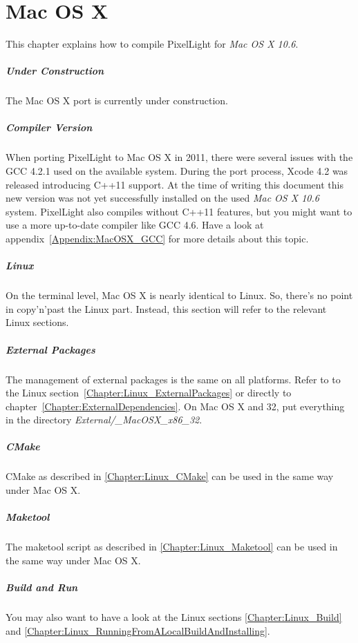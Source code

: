 \chapter{Mac OS X}
This chapter explains how to compile PixelLight for \emph{Mac OS X 10.6}.


\paragraph{Under Construction}
The Mac OS X port is currently under construction.


\paragraph{Compiler Version}
When porting PixelLight to Mac OS X in 2011, there were several issues with the \ac{GCC} 4.2.1 used on the available system. During the port process, Xcode 4.2 was released introducing C++11 support. At the time of writing this document this new version was not yet successfully installed on the used \emph{Mac OS X 10.6} system. PixelLight also compiles without C++11 features, but you might want to use a more up-to-date compiler like \ac{GCC} 4.6. Have a look at appendix~\ref{Appendix:MacOSX_GCC} for more details about this topic.


\paragraph{Linux}
On the terminal level, Mac OS X is nearly identical to Linux. So, there's no point in copy'n'past the Linux part. Instead, this section will refer to the relevant Linux sections.


\paragraph{External Packages}
The management of external packages is the same on all platforms. Refer to to the Linux section~\ref{Chapter:Linux_ExternalPackages} or directly to chapter~\ref{Chapter:ExternalDependencies}. On Mac OS X and \SI{32}{\bit}, put everything in the directory \emph{External/\_MacOSX\_x86\_32}.


\paragraph{CMake}
CMake as described in \ref{Chapter:Linux_CMake} can be used in the same way under Mac OS X.


\paragraph{Maketool}
The maketool script as described in \ref{Chapter:Linux_Maketool} can be used in the same way under Mac OS X.


\paragraph{Build and Run}
You may also want to have a look at the Linux sections \ref{Chapter:Linux_Build} and \ref{Chapter:Linux_RunningFromALocalBuildAndInstalling}.
